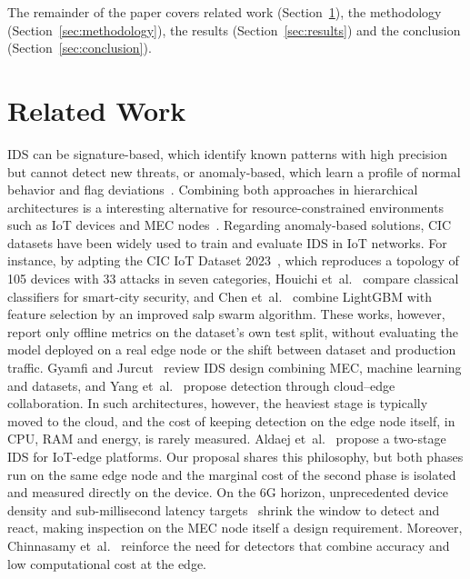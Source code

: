 \documentclass[conference]{IEEEtran}
\begin{document}
The remainder of the paper covers related work (Section~\ref{relatedWork}), the
methodology (Section~\ref{sec:methodology}), the results
(Section~\ref{sec:results}) and the conclusion (Section~\ref{sec:conclusion}).

\section{Related Work}
\label{relatedWork}

IDS can be signature-based, which identify known patterns with high precision
but cannot detect new threats, or anomaly-based, which learn a profile of
normal behavior and flag deviations~\cite{lazarevic:05}. Combining both
approaches in hierarchical architectures is a interesting alternative for
resource-constrained environments such as IoT devices and MEC
nodes~\cite{zolanvari:19}. Regarding anomaly-based solutions, CIC datasets have been widely used to train and evaluate IDS in IoT networks. For instance, by adpting the CIC IoT Dataset 2023~\cite{neto:23}, which reproduces a
topology of 105 devices with 33 attacks in seven categories, Houichi et~al.~\cite{houichi:25} compare classical classifiers for smart-city security, and Chen et~al.~\cite{chen:24} combine LightGBM with feature selection by an improved salp swarm algorithm. These works, however, report
only offline metrics on the dataset's own test split, without evaluating the
model deployed on a real edge node or the shift between dataset and production
traffic. Gyamfi and Jurcut~\cite{gyamfi:22} review IDS design combining MEC,
machine learning and datasets, and Yang et~al.~\cite{yang:23} propose
detection through cloud--edge collaboration. In such architectures, however,
the heaviest stage is typically moved to the cloud, and the cost of keeping
detection on the edge node itself, in CPU, RAM and energy, is rarely measured.
Aldaej et~al.~\cite{aldaej:24} propose a two-stage IDS for IoT-edge platforms. Our proposal shares this philosophy, but both phases run on the same edge node and the marginal cost of the second phase is isolated and measured directly on the device. On the 6G horizon, unprecedented device density and sub-millisecond latency targets~\cite{you:21} shrink the window to detect and react, making inspection on the MEC node itself a design requirement. Moreover, Chinnasamy et~al.~\cite{chinnasamy:25} reinforce the need for detectors that combine accuracy and low computational cost at the edge.
\end{document}
